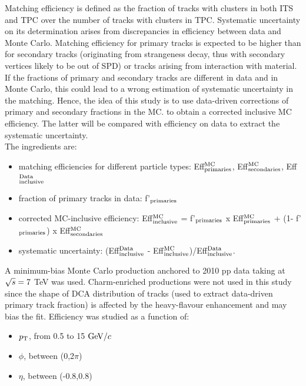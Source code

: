 Matching efficiency is defined as the fraction of tracks with 
clusters in both ITS and TPC over the number of tracks with clusters in TPC.
Systematic uncertainty on its determination arises from discrepancies 
in efficiency between data and Monte Carlo.
Matching efficiency for primary tracks is expected to be higher than 
for secondary tracks (originating from strangeness decay, thus 
with secondary vertices likely to be out of SPD) or tracks arising
 from interaction with material.
If the fractions of primary and secondary tracks are different in data 
and in Monte Carlo, this could lead to a wrong estimation of systematic 
uncertainty in the matching. Hence, the idea of this study is to 
use data-driven corrections of primary and secondary fractions in the MC.
to obtain a corrected inclusive MC efficiency. The latter will be compared 
with efficiency on data to extract the systematic uncertainty.\\
The ingredients are:
\begin{itemize}
\item matching efficiencies for different particle types: 
Eff$^{\rm MC}_{\rm primaries}$, Eff$^{\rm MC}_{\rm secondaries}$, Eff$^{\rm Data}_{\rm inclusive}$
\item fraction of primary tracks in data: f'$_{\rm primaries}$
\item corrected MC-inclusive efficiency: 
Eff$^{\rm MC}_{\rm inclusive}$ = f'$_{\rm primaries}$ x Eff$^{\rm MC}_{\rm primaries}$ + (1- f'$_{\rm primaries}$) x Eff$^{\rm MC}_{\rm secondaries}$
\item systematic uncertainty: 
(Eff$^{\rm Data}_{\rm inclusive}$ - Eff$^{\rm MC}_{\rm inclusive}$)/Eff$^{\rm Data}_{\rm inclusive}$.
\end{itemize}
A minimum-bias Monte Carlo production anchored to 2010 pp data taking at 
$\sqrt{s} = 7$ TeV was used. Charm-enriched productions were not used in this study 
since the shape of DCA distribution of tracks (used to extract data-driven 
primary track fraction) is affected by the heavy-flavour enhancement
and may bias the fit.
Efficiency was studied as a function of:
\begin{itemize}
\item $p_{\rm T}$, from 0.5 to 15 $\mathrm{GeV}/c$
\item $\phi$, between (0,2$\pi$)
\item $\eta$, between (-0.8,0.8)
\end{itemize}

